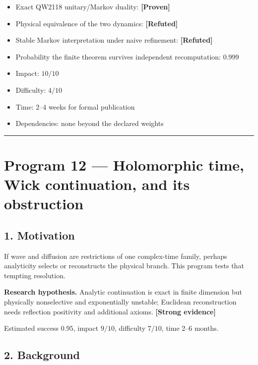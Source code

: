 \documentclass[11pt,a4paper,openany]{report}
\newcommand{\statusProven}{\textcolor{fingreen}{[Proven]}}
\newcommand{\statusStrong}{\textcolor{finblue}{[Strong evidence]}}
\newcommand{\statusRefuted}{\textcolor{finred}{[Refuted]}}
\begin{document}
\begin{itemize}
\item 
Exact QW2118 unitary/\allowbreak{}Markov duality: \textbf{\statusProven{}}

\item 
Physical equivalence of the two dynamics: \textbf{\statusRefuted{}}

\item 
Stable Markov interpretation under naive refinement: \textbf{\statusRefuted{}}

\item 
Probability the finite theorem survives independent recomputation: \(0.999\)

\item 
Impact: \(10/10\)

\item 
Difficulty: \(4/10\)

\item 
Time: 2–4 weeks for formal publication

\item 
Dependencies: none beyond the declared weights

\end{itemize}

\par\medskip\hrule\medskip

\chapter{Program 12 — Holomorphic time, Wick continuation, and its obstruction}

\section{1. Motivation}

If wave and diffusion are restrictions of one complex-time family, perhaps analyticity selects or reconstructs the physical branch. This program tests that tempting resolution.

\textbf{Research hypothesis.} Analytic continuation is exact in finite dimension but physically nonselective and exponentially unstable; Euclidean reconstruction needs reflection positivity and additional axioms. \textbf{\statusStrong{}}

Estimated success \(0.95\), impact \(9/10\), difficulty \(7/10\), time 2–6 months.

\section{2. Background}
\end{document}
